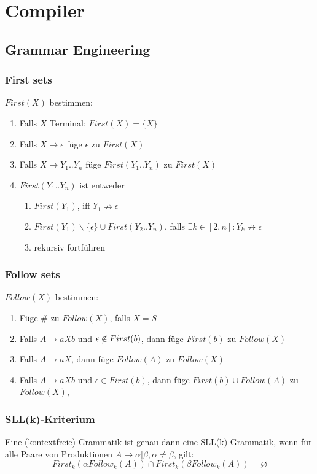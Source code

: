 \section{Compiler}
\subsection{Grammar Engineering}
\subsubsection{First sets}
$First(X)$ bestimmen:
\begin{enumerate}
	\item Falls $X$ Terminal: $First(X) = \{X\}$
	\item Falls $X  \rightarrow \epsilon$ füge $\epsilon$ zu $First(X)$
	\item Falls $X \rightarrow Y_1..Y_n$ füge $First(Y_1..Y_n)$ zu $First(X)$
	\item $First(Y_1..Y_n)$ ist entweder
	\begin{enumerate}
		\item $First(Y_1)$, iff $Y_1  \nrightarrow \epsilon$
		\item $First(Y_1) \backslash \{\epsilon\} \cup First(Y_2..Y_n)$,  falls $\exists k \in [2,n]: Y_k \nrightarrow \epsilon$
		\item rekursiv fortführen
	\end{enumerate}
\end{enumerate}
\subsubsection{Follow sets}
$Follow(X)$ bestimmen:
\begin{enumerate}
	\item Füge $\#$ zu $Follow(X)$, falls $X=S$
	\item Falls $A \rightarrow aXb$ und $\epsilon \centernot\in First(b)$, dann füge $First(b)$ zu $Follow(X)$
	\item Falls $A \rightarrow aX$, dann füge $Follow(A)$ zu $Follow(X)$
	\item Falls $A \rightarrow aXb$ und $\epsilon \in First(b)$, dann füge $First(b) \cup Follow(A)$ zu $Follow(X)$, 
\end{enumerate} 
\subsubsection{SLL(k)-Kriterium}
Eine (kontextfreie) Grammatik ist genau dann eine SLL(k)-Grammatik, wenn für alle Paare von Produktionen
\(A \rightarrow \alpha|\beta, \alpha \neq \beta\), gilt:
\[\mathit{First}_k(\alpha\mathit{Follow}_k(A)) \cap \mathit{First}_k(\beta\mathit{Follow}_k(A)) = \varnothing\]

